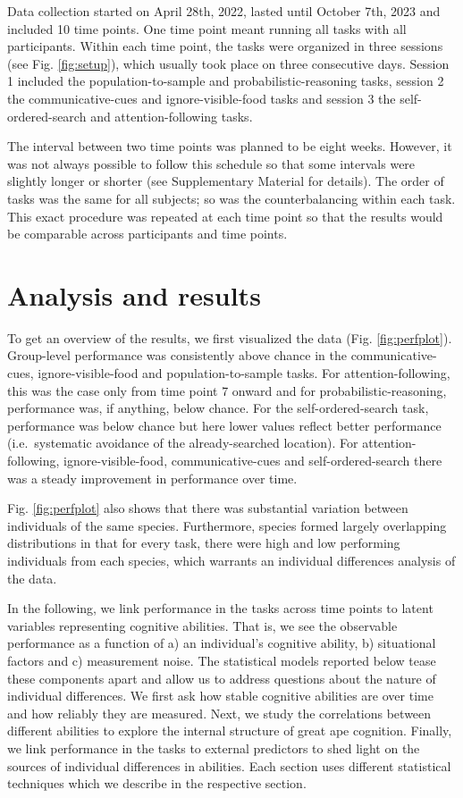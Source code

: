 \documentclass[
  man,floatsintext]{apa6}
\begin{document}
Data collection started on April 28th, 2022, lasted until October 7th, 2023 and included 10 time points. One time point meant running all tasks with all participants. Within each time point, the tasks were organized in three sessions (see Fig. \ref{fig:setup}), which usually took place on three consecutive days. Session 1 included the population-to-sample and probabilistic-reasoning tasks, session 2 the communicative-cues and ignore-visible-food tasks and session 3 the self-ordered-search and attention-following tasks.

The interval between two time points was planned to be eight weeks. However, it was not always possible to follow this schedule so that some intervals were slightly longer or shorter (see Supplementary Material for details). The order of tasks was the same for all subjects; so was the counterbalancing within each task. This exact procedure was repeated at each time point so that the results would be comparable across participants and time points.

\section{Analysis and results}\label{analysis-and-results}

To get an overview of the results, we first visualized the data (Fig. \ref{fig:perfplot}). Group-level performance was consistently above chance in the communicative-cues, ignore-visible-food and population-to-sample tasks. For attention-following, this was the case only from time point 7 onward and for probabilistic-reasoning, performance was, if anything, below chance. For the self-ordered-search task, performance was below chance but here lower values reflect better performance (i.e.~systematic avoidance of the already-searched location). For attention-following, ignore-visible-food, communicative-cues and self-ordered-search there was a steady improvement in performance over time.

Fig. \ref{fig:perfplot} also shows that there was substantial variation between individuals of the same species. Furthermore, species formed largely overlapping distributions in that for every task, there were high and low performing individuals from each species, which warrants an individual differences analysis of the data.

In the following, we link performance in the tasks across time points to latent variables representing cognitive abilities. That is, we see the observable performance as a function of a) an individual's cognitive ability, b) situational factors and c) measurement noise. The statistical models reported below tease these components apart and allow us to address questions about the nature of individual differences. We first ask how stable cognitive abilities are over time and how reliably they are measured. Next, we study the correlations between different abilities to explore the internal structure of great ape cognition. Finally, we link performance in the tasks to external predictors to shed light on the sources of individual differences in abilities. Each section uses different statistical techniques which we describe in the respective section.
\end{document}
